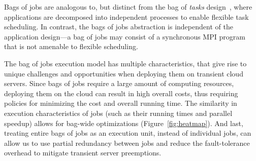 Bags of jobs are analogous to, but distinct from the bag of \emph{tasks} design~\cite{bot-2003}, where applications are decomposed into independent processes to enable flexible task scheduling. 
In contrast, the bags of jobs abstraction is independent of the application design---a bag of jobs may consist of a synchronous MPI program that is not amenable to flexible scheduling. 




The bag of jobs execution model has multiple characteristics, that give rise to unique challenges and opportunities when deploying them on transient cloud servers. 
Since bags of jobs require a large amount of computing resources, deploying them on the cloud can result in high overall costs, thus requiring policies for minimizing the cost and overall running time. 
The similarity in execution characteristics of jobs (such as their running times and parallel speedup) allows for bag-wide optimizations (Figure~\ref{fig:heatmap}). 
And last, treating entire bags of jobs as an execution unit, instead of individual jobs, can allow us to use partial redundancy between jobs and reduce the fault-tolerance overhead to mitigate transient server preemptions. 



